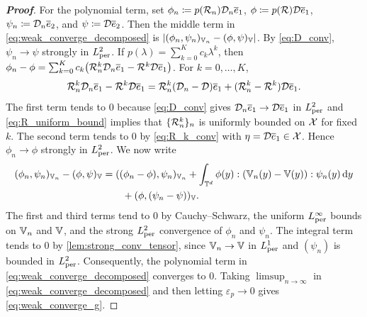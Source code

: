 \begin{proof}[\bf Proof]
For the polynomial term, set $\phi_n\coloneqq p({\mathcal{R}}_n){\mathcal{D}}_n\overline e_1$, $\phi\coloneqq p({\mathcal{R}}){\mathcal{D}}\overline e_1$, $\psi_n\coloneqq {\mathcal{D}}_n\overline e_2$, and $\psi\coloneqq {\mathcal{D}}\overline e_2$. Then the middle term in \cref{eq:weak_converge_decomposed} is $| (\phi_n,\psi_n)_{\mathbb{V}_n}-(\phi,\psi)_{\mathbb{V}}|$. By \cref{eq:D_conv}, $\psi_n\to\psi$ strongly in $L^2_{\rm per}$. If $p(\lambda)=\sum_{k=0}^K c_k\lambda^k$, then $\phi_n-\phi=\sum_{k=0}^K c_k\bigl({\mathcal{R}}_n^k{\mathcal{D}}_n\overline e_1-{\mathcal{R}}^k{\mathcal{D}}\overline e_1\bigr)$. For $k=0,\dots,K$,
\begin{equation*}
{\mathcal{R}}_n^k{\mathcal{D}}_n\overline e_1-{\mathcal{R}}^k{\mathcal{D}}\overline e_1
={\mathcal{R}}_n^k({\mathcal{D}}_n-{\mathcal{D}})\overline e_1+({\mathcal{R}}_n^k-{\mathcal{R}}^k){\mathcal{D}}\overline e_1.
\end{equation*}
The first term tends to $0$ because \cref{eq:D_conv} gives ${\mathcal{D}}_n\overline e_1\to {\mathcal{D}}\overline e_1$ in $L^2_{\rm per}$ and \cref{eq:R_uniform_bound} implies that $\{{\mathcal{R}}_n^k\}_n$ is uniformly bounded on ${\mathcal{X}}$ for fixed $k$. The second term tends to $0$ by \cref{eq:R_k_conv} with $\eta={\mathcal{D}}\overline e_1\in{\mathcal{X}}$. Hence $\phi_n\to\phi$ strongly in $L^2_{\rm per}$. {We now write}
\begin{align*}
    (\phi_n,\psi_n)_{\mathbb{V}_n}-(\phi,\psi)_{\mathbb{V}}
    &=((\phi_n-\phi),\psi_n)_{\mathbb{V}_n}+\int_{\mathbb{T}^d}\phi(y):(\mathbb{V}_n(y)-\mathbb{V}(y)):\psi_n(y)\,\mathrm{d}y\\
    &\qquad +(\phi,(\psi_n-\psi))_{\mathbb{V}}.
\end{align*}
The first and third terms tend to $0$ by Cauchy--Schwarz, the uniform $L^\infty_{\rm per}$ bounds on $\mathbb{V}_n$ and $\mathbb{V}$, and the strong $L^2_{\rm per}$ convergence of $\phi_n$ and $\psi_n$. The integral term tends to $0$ by \cref{lem:strong_conv_tensor}, since $\mathbb{V}_n\to\mathbb{V}$ in $L^1_{\rm per}$ and $(\psi_n)$ is bounded in $L^2_{\rm per}$. Consequently, the polynomial term in \cref{eq:weak_converge_decomposed} converges to $0$. Taking $\limsup_{n\to\infty}$ in \cref{eq:weak_converge_decomposed} and then letting $\varepsilon_p\to0$ gives \cref{eq:weak_converge_g}.
\end{proof}

